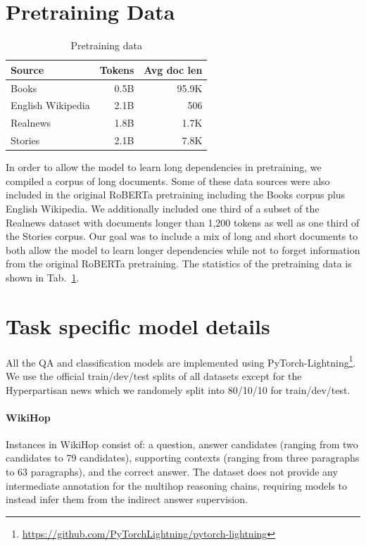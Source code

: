 \section{Pretraining Data}
\label{sec:mlm_data}

\begin{table}[t]
\centering
\small
\begin{tabular}{@{}lrr@{}}
\toprule
Source    & Tokens & Avg doc len \\ \midrule
Books \cite{Zhu2015AligningBA}    & 0.5B              & 95.9K\\
English Wikipedia & 2.1B              & 506 \\
Realnews \cite{Zellers2019DefendingAN}  & 1.8B              & 1.7K\\
Stories \cite{Trinh2018ASM}  & 2.1B              & 7.8K \\ \bottomrule
\end{tabular}
\caption{Pretraining data}\label{tab:pretrain-data}
\end{table}

In order to allow the model to learn long dependencies in pretraining, we compiled a corpus of long documents. Some of these data sources were also included in the original RoBERTa pretraining including the Books corpus \cite{Zhu2015AligningBA} plus English Wikipedia. We additionally included one third of a subset of the Realnews dataset \cite{Zellers2019DefendingAN} with documents longer than 1,200 tokens as well as one third of the Stories \cite{Trinh2018ASM} corpus. Our goal was to include a mix of long and short documents to both allow the model to learn longer dependencies while not to forget information from the original RoBERTa pretraining. The statistics of the pretraining data is shown in Tab.~\ref{tab:pretrain-data}.


\section{Task specific model details}
All the QA and classification models are implemented using PyTorch-Lightning\footnote{\url{https://github.com/PyTorchLightning/pytorch-lightning}}.  We use the official train/dev/test splits of all datasets except for the Hyperpartisan news which we randomely split into 80/10/10 for train/dev/test.

\label{sec:taskdetails}

\paragraph{WikiHop} Instances in WikiHop consist of: a question, answer candidates (ranging from two candidates to 79 candidates), supporting contexts (ranging from three paragraphs to 63 paragraphs), and the correct answer.  The dataset does not provide any intermediate annotation for the multihop reasoning chains, requiring models to instead infer them from the indirect answer supervision.

